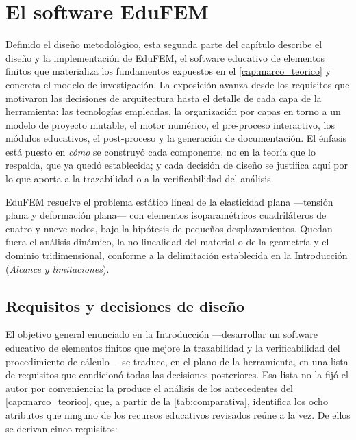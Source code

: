 \section{El software EduFEM}
\label{sec:diseno-edufem}

Definido el diseño metodológico, esta segunda parte del capítulo describe el diseño y la implementación de EduFEM, el software educativo de elementos finitos que materializa los fundamentos expuestos en el \autoref{cap:marco_teorico} y concreta el modelo de investigación. La exposición avanza desde los requisitos que motivaron las decisiones de arquitectura hasta el detalle de cada capa de la herramienta: las tecnologías empleadas, la organización por capas en torno a un modelo de proyecto mutable, el motor numérico, el pre-proceso interactivo, los módulos educativos, el post-proceso y la generación de documentación. El énfasis está puesto en \emph{cómo} se construyó cada componente, no en la teoría que lo respalda, que ya quedó establecida; y cada decisión de diseño se justifica aquí por lo que aporta a la trazabilidad o a la verificabilidad del análisis.

EduFEM resuelve el problema estático lineal de la elasticidad plana —tensión plana y deformación plana— con elementos isoparamétricos cuadriláteros de cuatro y nueve nodos, bajo la hipótesis de pequeños desplazamientos. Quedan fuera el análisis dinámico, la no linealidad del material o de la geometría y el dominio tridimensional, conforme a la delimitación establecida en la Introducción (\emph{Alcance y limitaciones}).

\subsection{Requisitos y decisiones de diseño}
\label{sec:requisitos}

El objetivo general enunciado en la Introducción ---desarrollar un software educativo de elementos finitos que mejore la trazabilidad y la verificabilidad del procedimiento de cálculo--- se traduce, en el plano de la herramienta, en una lista de requisitos que condicionó todas las decisiones posteriores. Esa lista no la fijó el autor por conveniencia: la produce el análisis de los antecedentes del \autoref{cap:marco_teorico}, que, a partir de la \autoref{tab:comparativa}, identifica los ocho atributos que ninguno de los recursos educativos revisados reúne a la vez. De ellos se derivan cinco requisitos:

